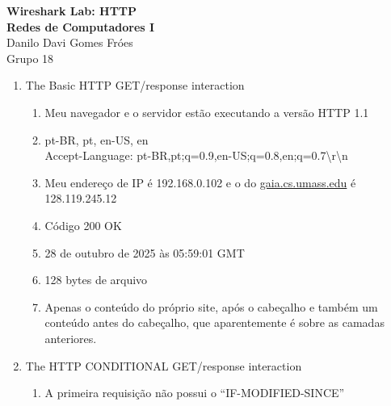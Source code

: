 \documentclass[12pt,a4paper]{article}
\begin{document}
\begin{center}
    {\Large \textbf{Wireshark Lab: HTTP}} \\[0.2cm]
    {\Large \textbf{Redes de Computadores I}} \\[0.6cm]
    Danilo Davi Gomes Fróes \\
    Grupo 18
\end{center}

\vspace{0.5cm}

\begin{enumerate}[itemsep=1.5em]
    \item The Basic HTTP GET/response interaction

        \begin{enumerate}[label=\theenumi.\arabic*., itemsep=1em]
            \item Meu navegador e o servidor estão executando a versão HTTP 1.1
            
            \item pt-BR, pt, en-US, en \\
            Accept-Language: pt-BR,pt;q=0.9,en-US;q=0.8,en;q=0.7\textbackslash r\textbackslash n
            
            \item Meu endereço de IP é 192.168.0.102 e o do \href{http://gaia.cs.umass.edu}{gaia.cs.umass.edu} é 128.119.245.12
            
            \item Código 200 OK
            
            \item 28 de outubro de 2025 às 05:59:01 GMT
            
            \item 128 bytes de arquivo
            
            \item Apenas o conteúdo do próprio site, após o cabeçalho e também um conteúdo antes do cabeçalho, que aparentemente é sobre as camadas anteriores.
        \end{enumerate}
    
    \vspace{0.5cm}

    \item The HTTP CONDITIONAL GET/response interaction
    
        \begin{enumerate}[label=\theenumi.\arabic*., itemsep=1em]
            \item A primeira requisição não possui o ``IF-MODIFIED-SINCE''
            

\end{enumerate}
\end{enumerate}
\end{document}
